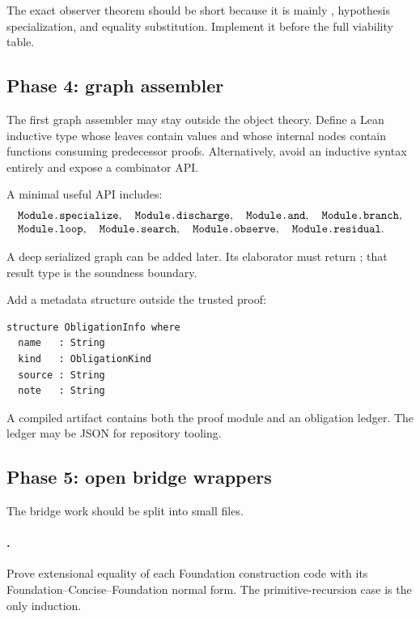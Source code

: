 The exact observer theorem should be short because it is mainly
, hypothesis specialization, and equality
substitution.  Implement it before the full viability table.

\subsection{Phase 4: graph assembler}

The first graph assembler may stay outside the object theory.  Define a Lean
inductive type whose leaves contain  values and whose internal
nodes contain functions consuming predecessor proofs.  Alternatively, avoid
an inductive syntax entirely and expose a combinator API.

A minimal useful API includes:
\[
\begin{array}{l}
\code{Module.specialize},\quad
\code{Module.discharge},\quad
\code{Module.and},\quad
\code{Module.branch},\\
\code{Module.loop},\quad
\code{Module.search},\quad
\code{Module.observe},\quad
\code{Module.residual}.
\end{array}
\]

A deep serialized graph can be added later.  Its elaborator must return
; that result type is the soundness boundary.

Add a metadata structure outside the trusted proof:
\begin{lstlisting}[language={}]
structure ObligationInfo where
  name   : String
  kind   : ObligationKind
  source : String
  note   : String
\end{lstlisting}
A compiled artifact contains both the proof module and an obligation ledger.
The ledger may be JSON for repository tooling.

\subsection{Phase 5: open bridge wrappers}

The bridge work should be split into small files.

\paragraph{.}
Prove extensional equality of each Foundation construction code with its
Foundation--Concise--Foundation normal form.  The primitive-recursion case is
the only induction.

